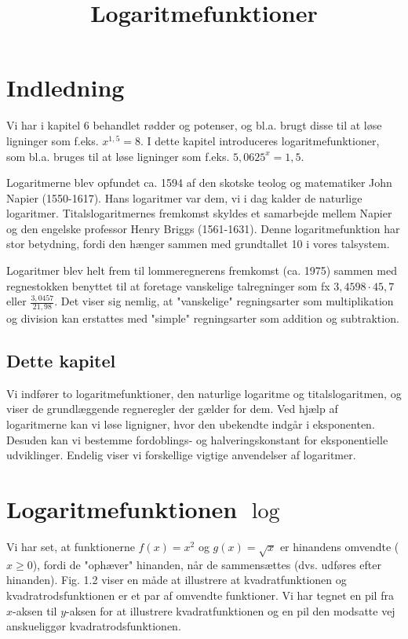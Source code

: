 \documentclass[12pt,oneside,a4paper]{article}
\title{Logaritmefunktioner}
\date{\vspace{-5ex}}
\theoremstyle{plain}
\begin{document}
\maketitle

\section*{Indledning}
Vi har i kapitel 6 behandlet rødder og potenser, og bl.a. brugt disse
til at løse ligninger som f.eks. $x^{1,5} = 8$.
I dette kapitel introduceres logaritmefunktioner, som bl.a. bruges
til at løse ligninger som f.eks. $5,0625^x = 1,5$.

Logaritmerne blev opfundet ca. 1594 af den skotske teolog og matematiker John
Napier (1550-1617). Hans logaritmer var dem, vi i dag kalder de naturlige
logaritmer. Titalslogaritmernes fremkomst skyldes et samarbejde mellem Napier
og den engelske professor Henry Briggs (1561-1631). Denne logaritmefunktion har
stor betydning, fordi den hænger sammen med grundtallet 10 i vores talsystem.

Logaritmer blev helt frem til lommeregnerens fremkomst (ca. 1975) sammen med
regnestokken benyttet til at foretage vanskelige talregninger som fx $3,4598
\cdot 45,7$ eller $\frac{3,0457}{21,98}$. Det viser sig nemlig, at "vanskelige"
regningsarter som multiplikation og division kan erstattes med "simple"
regningsarter som addition og subtraktion.

\subsection*{Dette kapitel}

Vi indfører to logaritmefunktioner, den naturlige logaritme og
titalslogaritmen, og viser de grundlæggende regneregler der gælder for dem. Ved
hjælp af logaritmerne kan vi løse lignigner, hvor den ubekendte indgår i
eksponenten.  Desuden kan vi bestemme fordoblings- og halveringskonstant for
eksponentielle udviklinger. Endelig viser vi forskellige vigtige anvendelser af
logaritmer.

\section*{Logaritmefunktionen $\log$}
Vi har set, at funktionerne $f(x) = x^2$ og $g(x) = \sqrt{x}$  er hinandens omvendte
($x \geq 0$), fordi de "ophæver" hinanden, når de sammensættes (dvs. udføres
efter hinanden). Fig. 1.2 viser en måde at illustrere at kvadratfunktionen og
kvadratrodsfunktionen er et par af omvendte funktioner. Vi har tegnet en pil
fra $x$-aksen til $y$-aksen for at illustrere kvadratfunktionen og en pil den
modsatte vej anskueliggør kvadratrodsfunktionen.
\end{document}
